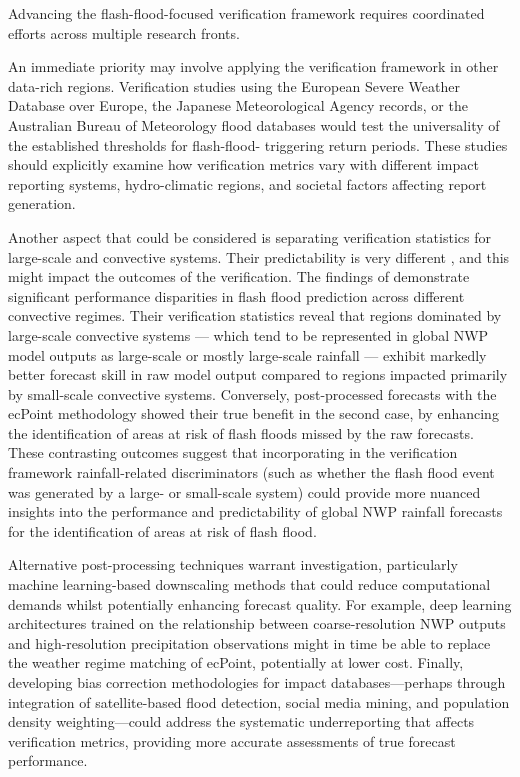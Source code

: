 Advancing the flash-flood-focused verification framework requires coordinated efforts across multiple research fronts. 

An immediate priority may involve applying the verification framework in other data-rich regions. Verification studies using the European Severe Weather Database over Europe, the Japanese Meteorological Agency records, or the Australian Bureau of Meteorology flood databases would test the universality of the established thresholds for flash-flood- triggering return periods. These studies should explicitly examine how verification metrics vary with different impact reporting systems, hydro-climatic regions, and societal factors affecting report generation.

Another aspect that could be considered is separating verification statistics for large-scale and convective systems. Their predictability is very different \citep{Pillosu_2024}, and this might impact the outcomes of the verification. The findings of \citet{Pillosu_2024} demonstrate significant performance disparities in flash flood prediction across different convective regimes. Their verification statistics reveal that regions dominated by large-scale convective systems — which tend to be represented in global NWP model outputs as large-scale or mostly large-scale rainfall — exhibit markedly better forecast skill in raw model output compared to regions impacted primarily by small-scale convective systems. Conversely, post-processed forecasts with the ecPoint methodology showed their true benefit in the second case, by enhancing the identification of areas at risk of flash floods missed by the raw forecasts. These contrasting outcomes suggest that incorporating in the verification framework rainfall-related discriminators (such as whether the flash flood event was generated by a large- or small-scale system) could provide more nuanced insights into the performance and predictability of global NWP rainfall forecasts for the identification of areas at risk of flash flood.

Alternative post-processing techniques warrant investigation, particularly machine learning-based downscaling methods that could reduce computational demands whilst potentially enhancing forecast quality. For example, deep learning architectures trained on the relationship between coarse-resolution NWP outputs and high-resolution precipitation observations might in time be able to replace the weather regime matching of ecPoint, potentially at lower cost. Finally, developing bias correction methodologies for impact databases—perhaps through integration of satellite-based flood detection, social media mining, and population density weighting—could address the systematic underreporting that affects verification metrics, providing more accurate assessments of true forecast performance.


